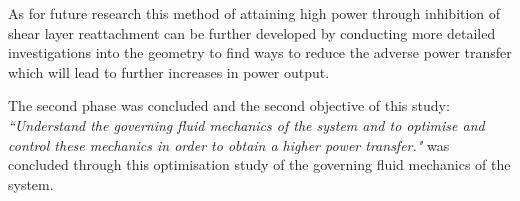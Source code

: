  As for future research this method of attaining high power through inhibition of shear layer reattachment can be further developed by conducting more detailed investigations into the geometry to find ways to reduce the adverse power transfer which will lead to further increases in power output.
 
The second phase was concluded and the second objective of this study:\emph{ ``Understand the governing fluid mechanics of the system and to optimise and control these mechanics in order to obtain a higher power transfer."} was concluded through this optimisation study of the governing fluid mechanics of the system. 
 
 
 
 